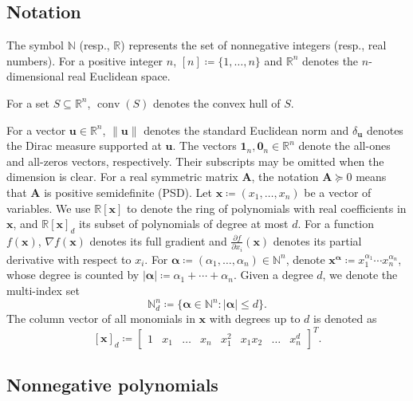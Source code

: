 \documentclass[pdflatex,sn-mathphys-num]{sn-jnl}%
\newcommand{\vect}[1]{\boldsymbol{#1}}
\newcommand{\mat}[1]{\boldsymbol{#1}}
\theoremstyle{thmstyleone}%
\theoremstyle{thmstyletwo}%
\theoremstyle{thmstylethree}%
\begin{document}
\subsection{Notation}
The symbol $\mathbb{N}$ (resp., $\mathbb{R}$) represents the set of 
nonnegative integers (resp., real numbers).
For a positive integer $n$, $[n]\coloneqq \{1,\ldots, n\}$ and 
$\mathbb{R}^n$ denotes the $n$-dimensional real Euclidean space.

For a set $S\subseteq\mathbb{R}^n$, $\operatorname{conv}(S)$ denotes
the convex hull of $S$.

For a vector $\vect{u} \in \mathbb{R}^n$, $\|\vect{u}\|$ denotes the standard 
Euclidean norm and $\delta_{\vect{u}}$ denotes the Dirac measure supported at $\vect{u}$.
The vectors $\mathbf{1}_n,\mathbf{0}_n\in\mathbb{R}^n$
denote the all-ones and all-zeros vectors, respectively.
Their subscripts may be omitted when the dimension is clear.
For a real symmetric matrix $\mat{A}$, the notation $\mat{A}\succeq0$
means that $\mat{A}$ is positive semidefinite (PSD).
Let $\vect{x} \coloneqq (x_1, \ldots, x_n)$ be a vector of variables.
We use $\mathbb{R}[\vect{x}]$ to denote the ring of polynomials 
with real coefficients in $\vect{x}$,
and $\mathbb{R}[\vect{x}]_d$ its subset of polynomials
of degree at most $d$.
For a function $f(\vect{x})$, $\nabla f(\vect{x})$ denotes its full gradient
and $\frac{\partial f}{\partial x_i}(\vect{x})$ denotes its partial
derivative with respect to $x_i$.
For $\vect{\alpha} \coloneqq (\alpha_1, \ldots, \alpha_n)\in \mathbb{N}^n$,
denote $\vect{x}^{\vect{\alpha}} \coloneqq x_1^{\alpha_1} \cdots x_n^{\alpha_n}$,
whose degree is counted by $|\vect{\alpha}| \coloneqq \alpha_1 + \cdots + \alpha_n$.
Given a degree $d$, we denote the multi-index set
\[
\mathbb{N}_d^n \coloneqq \{\vect{\alpha} \in \mathbb{N}^n : |\vect{\alpha}| \leq d \} .
\]
The column vector of all monomials in $\vect{x}$ with degrees up to $d$ is denoted as
\begin{equation}\label{eq:xvec}
	[\vect{x}]_d \coloneqq \begin{bmatrix}
		1 & x_1 & \ldots & x_n & x_1^2 & x_1x_2 & \ldots & x_n^d
	\end{bmatrix}^T.
\end{equation}



\subsection{Nonnegative polynomials}
\end{document}
